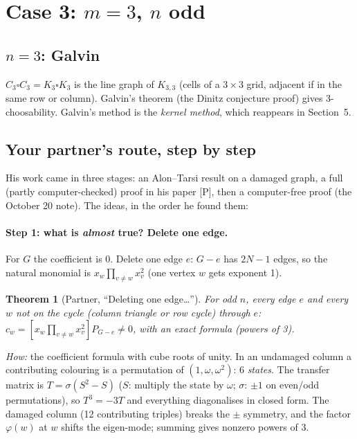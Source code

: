 \documentclass[11pt]{article}
\theoremstyle{plain}
\newtheorem{theorem}{Theorem}[section]
\theoremstyle{definition}
\newcommand{\T}{\square}
\begin{document}
\section{Case 3: \texorpdfstring{$m=3$}{m = 3}, \texorpdfstring{$n$}{n} odd}

\subsection{$n=3$: Galvin}
$C_3\T C_3=K_3\T K_3$ is the line graph of $K_{3,3}$ (cells of a $3\times3$ grid, adjacent if
in the same row or column). Galvin's theorem (the Dinitz conjecture proof) gives
3-choosability. Galvin's method is the \emph{kernel method}, which reappears in
Section~5.

\subsection{Your partner's route, step by step}

His work came in three stages: an Alon--Tarsi result on a damaged graph, a full
(partly computer-checked) proof in his paper [P], then a computer-free proof (the
October 20 note). The ideas, in the order he found them:

\paragraph{Step 1: what is \emph{almost} true? Delete one edge.}
For $G$ the coefficient is $0$. Delete one edge $e$: $G-e$ has $2N-1$ edges, so the natural
monomial is $x_w\prod_{v\ne w}x_v^2$ (one vertex $w$ gets exponent 1).

\begin{theorem}[Partner, ``Deleting one edge\ldots'']
For odd $n$, every edge $e$ and every $w$ not on the cycle (column triangle or row cycle)
through $e$: $c_w=[x_w\prod_{v\ne w}x_v^2]P_{G-e}\ne0$, with an exact formula (powers of 3).
\end{theorem}

\emph{How:} the coefficient formula with cube roots of unity. In an undamaged column a
contributing colouring is a permutation of $(1,\omega,\omega^2)$: 6 \emph{states}. The
transfer matrix is $T=\sigma(S^2-S)$ ($S$: multiply the state by $\omega$; $\sigma$: $\pm1$
on even/odd permutations), so $T^3=-3T$ and everything diagonalises in closed form. The
damaged column (12 contributing triples) breaks the $\pm$ symmetry, and the factor
$\varphi(w)$ at $w$ shifts the eigen-mode; summing gives nonzero powers of $3$.
\end{document}
